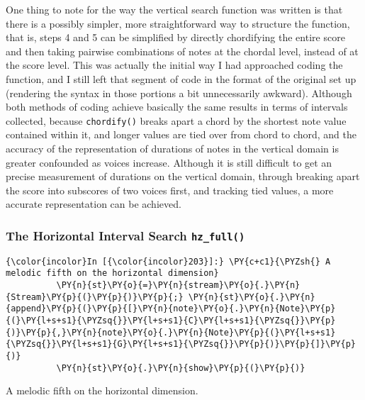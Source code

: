 One thing to note for the way the vertical search function was written
is that there is a possibly simpler, more straightforward way to
structure the function, that is, steps 4 and 5 can be simplified by
directly chordifying the entire score and then taking pairwise
combinations of notes at the chordal level, instead of at the score
level. This was actually the initial way I had approached coding the
function, and I still left that segment of code in the format of the
original set up (rendering the syntax in those portions a bit
unnecessarily awkward). Although both methods of coding achieve
basically the same results in terms of intervals collected, because
\texttt{chordify()} breaks apart a chord by the shortest note value
contained within it, and longer values are tied over from chord to
chord, and the accuracy of the representation of durations of notes in
the vertical domain is greater confounded as voices increase. Although
it is still difficult to get an precise measurement of durations on the
vertical domain, through breaking apart the score into subscores of two
voices first, and tracking tied values, a more accurate representation
can be achieved.

\subsubsection{\texorpdfstring{The Horizontal Interval Search
\texttt{hz\_full()}}{The Horizontal Interval Search hz\_full()}}\label{the-horizontal-interval-search-hz_full}


    \begin{Verbatim}[commandchars=\\\{\}]
{\color{incolor}In [{\color{incolor}203}]:} \PY{c+c1}{\PYZsh{} A melodic fifth on the horizontal dimension}
          \PY{n}{st}\PY{o}{=}\PY{n}{stream}\PY{o}{.}\PY{n}{Stream}\PY{p}{(}\PY{p}{)}\PY{p}{;} \PY{n}{st}\PY{o}{.}\PY{n}{append}\PY{p}{(}\PY{p}{[}\PY{n}{note}\PY{o}{.}\PY{n}{Note}\PY{p}{(}\PY{l+s+s1}{\PYZsq{}}\PY{l+s+s1}{C}\PY{l+s+s1}{\PYZsq{}}\PY{p}{)}\PY{p}{,}\PY{n}{note}\PY{o}{.}\PY{n}{Note}\PY{p}{(}\PY{l+s+s1}{\PYZsq{}}\PY{l+s+s1}{G}\PY{l+s+s1}{\PYZsq{}}\PY{p}{)}\PY{p}{]}\PY{p}{)}
          \PY{n}{st}\PY{o}{.}\PY{n}{show}\PY{p}{(}\PY{p}{)}
\end{Verbatim}

\begin{Example}[H]
    \begin{center}
    \caption{ A melodic fifth on the horizontal dimension. }
    \end{center}
\end{Example}
    
